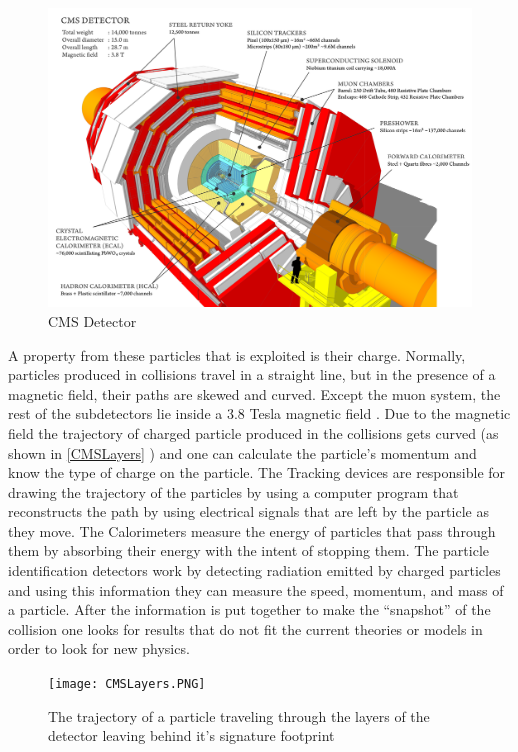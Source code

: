 \begin{figure}
\includegraphics[width=\linewidth]{CMSLayout.png}
\caption{CMS Detector \label{CMSLayout}}
\end{figure}

A property from these particles that is exploited is their charge. Normally, particles produced in collisions travel in a straight line, but in the presence of a magnetic field, their paths are skewed and curved. Except the muon system, the rest of the subdetectors lie inside a 3.8 Tesla magnetic field . Due to the magnetic field the trajectory of charged particle produced in the collisions gets curved  (as shown in \autoref{CMSLayers} ) and one can calculate the particle’s momentum and know the type of charge on the particle.  The Tracking devices are responsible for drawing the trajectory of the particles by using a computer program that reconstructs the path by using electrical signals that are left by the particle as they move.  The Calorimeters measure the energy of particles that pass through them by absorbing their energy with the intent of stopping them. The particle identification detectors work by detecting radiation emitted by charged particles and using this information they can measure the speed, momentum, and mass of a particle. After the information is put together to make the “snapshot” of the collision one looks for results that do not fit the current theories or models in order to look for new physics.

\begin{figure}[h]
\texttt{[image: CMSLayers.PNG]}
\caption{The trajectory of a particle traveling through the layers of the detector leaving behind it's signature footprint\label{CMSLayers}}
\end{figure}


